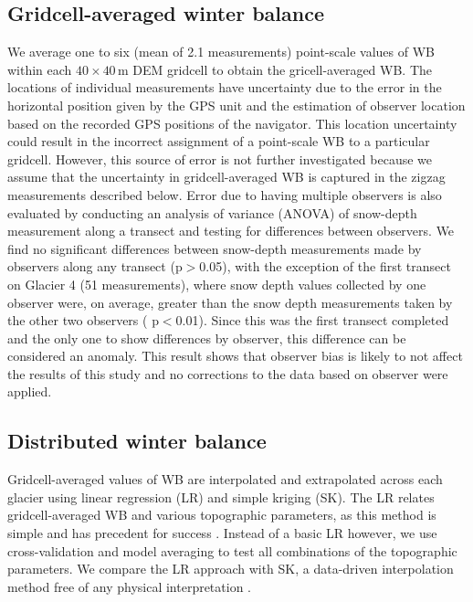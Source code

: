 \documentclass[twocolumn, letterpaper]{igs}
\begin{document}
\subsection{Gridcell-averaged winter balance}

We average one to six (mean of 2.1 measurements) point-scale values of WB within each $40 \times 40$\,m DEM gridcell to obtain the gricell-averaged WB. The locations of individual measurements have uncertainty due to the error in the horizontal position given by the GPS unit and the estimation of observer location based on the recorded GPS positions of the navigator. This location uncertainty could result in the incorrect assignment of a point-scale WB to a particular gridcell. However, this source of error is not further investigated because we assume that the uncertainty in gridcell-averaged WB is captured in the zigzag measurements described below. Error due to having multiple observers is also evaluated by conducting an analysis of variance (ANOVA) of snow-depth measurement along a transect and testing for differences between observers. We find no significant differences between snow-depth measurements made by observers along any transect (p$>$0.05), with the exception of the first transect on Glacier 4 (51 measurements), where snow depth values collected by one observer were, on average, greater than the snow depth measurements taken by the other two observers ( p$<$0.01). Since this was the first transect completed and the only one to show differences by observer, this difference can be considered an anomaly. This result shows that observer bias is likely to not affect the results of this study and no corrections to the data based on observer were applied.

\subsection{Distributed winter balance}

Gridcell-averaged values of WB are interpolated and extrapolated across each glacier using linear regression (LR) and simple kriging (SK). The LR relates gridcell-averaged WB and various topographic parameters, as this method is simple and has precedent for success \citep[e.g.][]{McGrath2015}. Instead of a basic LR however, we use cross-validation and model averaging to test all combinations of the topographic parameters. We compare the LR approach with SK, a data-driven interpolation method free of any physical interpretation \citep[e.g.][]{Hock1999}.
\end{document}
